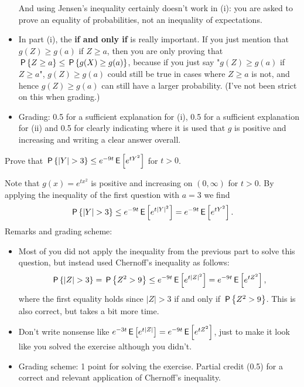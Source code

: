 \begin{exercise}[1.5]
\begin{solution}
\begin{itemize}
And using Jensen's inequality certainly doesn't work in (i): you are asked to prove an equality of probabilities, not an inequality of expectations. 
\item In part (i), the \textbf{if and only if} is really important. If you just mention that $g(Z) \geq g(a)$ if $Z \geq a$, then you are only proving that $\P{Z \geq a} \leq \P{g(X) \geq g(a)}$, because if you just say "$g(Z) \geq g(a)$ if $Z \geq a$",  $g(Z) \geq g(a)$ could still be true in cases where $Z \geq a$ is not, and hence  $g(Z) \geq g(a)$  can still have a larger probability. (I've not been strict on this when grading.)
\item Grading: 0.5 for a sufficient explanation for (i), 0.5 for a sufficient explanation for (ii) and 0.5 for clearly indicating where it is used that $g$ is positive and increasing and writing a clear answer overall. 
\end{itemize}
\end{solution}
\end{exercise}




\begin{exercise}[1]
Prove that $\P{|Y| > 3} \leq e^{-9t}\E{e^{t Y^2}}$ for $t>0$. \\
\begin{solution}
Note that $g(x) = e^{t x^2}$ is positive and increasing on $(0,\infty)$ for $t>0$. By applying the inequality of the first question with $a=3$ we find 
$$\P{|Y| > 3} \leq e^{-9t}\E{e^{t |Y|^2}} = e^{-9t}\E{e^{t Y^2}}.$$
\noindent Remarks and grading scheme:
\begin{itemize}
\item Most of you did not apply the inequality from the previous part to solve this question, but instead used Chernoff's inequality as follows:
$$\P{|Z| > 3} = \P{Z^2 > 9} \leq e^{-9t}\E{e^{t |Z|^2}} = e^{-9t}\E{e^{t Z^2}},$$
where the first equality holds since $|Z| > 3$ if and only if $\P{Z^2 > 9}$. This is also correct, but takes a bit more time. 
\item Don't write nonsense like $e^{-3t}\E{e^{t |Z|}} = e^{-9t}\E{e^{t Z^2}}$, just to make it look like you solved the exercise although you didn't. 
\item Grading scheme: 1 point for solving the exercise. Partial credit (0.5) for a correct and relevant application of Chernoff's inequality.
\end{itemize}
\end{solution}
\end{exercise}


